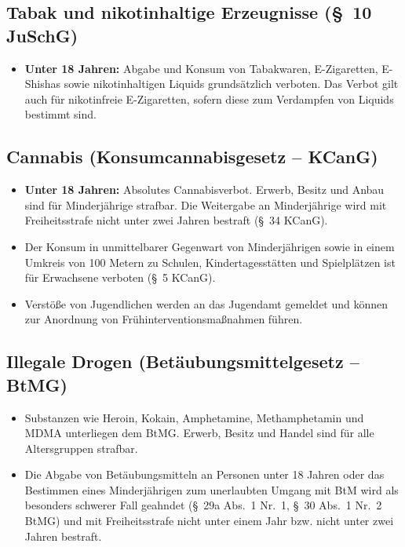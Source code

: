 \documentclass[11pt,a4paper]{article}
\begin{document}
	\subsection{Tabak und nikotinhaltige Erzeugnisse (\S~10 JuSchG)}
	\begin{itemize}[leftmargin=*, noitemsep]
		\item \textbf{Unter 18 Jahren:} Abgabe und Konsum von Tabakwaren, E-Zigaretten, E-Shishas sowie nikotinhaltigen Liquids grundsätzlich verboten. Das Verbot gilt auch für nikotinfreie E-Zigaretten, sofern diese zum Verdampfen von Liquids bestimmt sind.
	\end{itemize}
	
	\subsection{Cannabis (Konsumcannabisgesetz – KCanG)}
	\begin{itemize}[leftmargin=*, noitemsep]
		\item \textbf{Unter 18 Jahren:} Absolutes Cannabisverbot. Erwerb, Besitz und Anbau sind für Minderjährige strafbar. Die Weitergabe an Minderjährige wird mit Freiheitsstrafe nicht unter zwei Jahren bestraft (\S~34 KCanG).
		\item Der Konsum in unmittelbarer Gegenwart von Minderjährigen sowie in einem Umkreis von 100 Metern zu Schulen, Kindertagesstätten und Spielplätzen ist für Erwachsene verboten (\S~5 KCanG).
		\item Verstöße von Jugendlichen werden an das Jugendamt gemeldet und können zur Anordnung von Frühinterventionsmaßnahmen führen.
	\end{itemize}
	
	\subsection{Illegale Drogen (Betäubungsmittelgesetz – BtMG)}
	\begin{itemize}[leftmargin=*, noitemsep]
		\item Substanzen wie Heroin, Kokain, Amphetamine, Methamphetamin und MDMA unterliegen dem BtMG. Erwerb, Besitz und Handel sind für alle Altersgruppen strafbar.
		\item Die Abgabe von Betäubungsmitteln an Personen unter 18 Jahren oder das Bestimmen eines Minderjährigen zum unerlaubten Umgang mit BtM wird als besonders schwerer Fall geahndet (\S~29a Abs.~1 Nr.~1, \S~30 Abs.~1 Nr.~2 BtMG) und mit Freiheitsstrafe nicht unter einem Jahr bzw. nicht unter zwei Jahren bestraft.
	\end{itemize}
	
\end{document}

